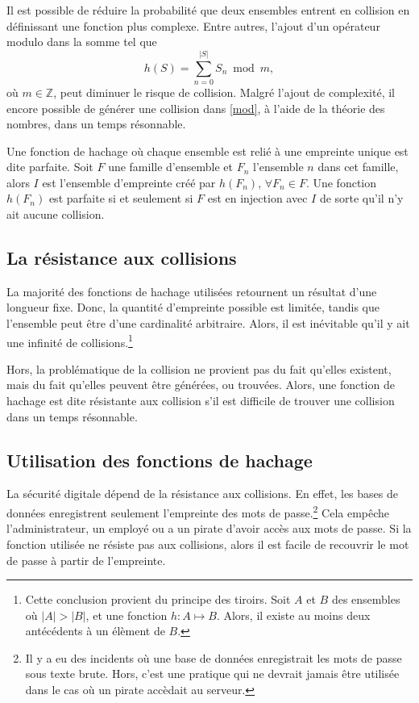 \documentclass[11pt]{article}
\begin{document}
Il est possible de réduire la probabilité que deux ensembles entrent en collision en définissant une fonction plus complexe. Entre autres, l'ajout d'un opérateur modulo dans la somme tel que
\begin{equation}\label{mod}
h(S)=\displaystyle\sum_{n=0}^{|S|}S_{n}\bmod{m},
\end{equation}
où $m\in\mathds{Z}$, peut diminuer le risque de collision. Malgré l'ajout de complexité, il encore possible de générer une collision dans \eqref{mod}, à l'aide de la théorie des nombres, dans un temps résonnable.

Une fonction de hachage où chaque ensemble est relié à une empreinte unique est dite parfaite. Soit $F$ une famille d'ensemble et $F_{n}$ l'ensemble $n$ dans cet famille, alors $I$ est l'ensemble d'empreinte créé par $h(F_{n})$, $\forall F_{n}\in F$. Une fonction $h(F_{n})$ est parfaite si et seulement si $F$ est en injection avec $I$ de sorte qu'il n'y ait aucune collision.

\subsection{La résistance aux collisions}
La majorité des fonctions de hachage utilisées retournent un résultat d'une longueur fixe. Donc, la quantité d'empreinte possible est limitée, tandis que l'ensemble peut être d'une cardinalité arbitraire. Alors, il est inévitable qu'il y ait une infinité de collisions.\footnote{Cette conclusion provient du principe des tiroirs. Soit $A$ et $B$ des ensembles où $|A|>|B|$, et une fonction $h:A\mapsto B$. Alors, il existe au moins deux antécédents à un élèment de $B$.\cite{tiroir}}

Hors, la problématique de la collision ne provient pas du fait qu'elles existent, mais du fait qu'elles peuvent être générées, ou trouvées. Alors, une fonction de hachage est dite résistante aux collision s'il est difficile de trouver une collision dans un temps résonnable.

\subsection{Utilisation des fonctions de hachage}
La sécurité digitale dépend de la résistance aux collisions. En effet, les bases de données enregistrent seulement l'empreinte des mots de passe.\footnote{Il y a eu des incidents où une base de données enregistrait les mots de passe sous texte brute. Hors, c'est une pratique qui ne devrait jamais être utilisée dans le cas où un pirate accèdait au serveur.\cite{PW1}\cite{PW2}} Cela empêche l'administrateur, un employé ou a un pirate d'avoir accès aux mots de passe. Si la fonction utilisée ne résiste pas aux collisions, alors il est facile de recouvrir le mot de passe à partir de l'empreinte.
\end{document}
